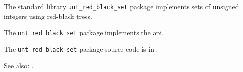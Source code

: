 
The standard library {\tt unt\_red\_black\_set} package implements sets of unsigned integers 
using red-black trees.

The {\tt unt\_red\_black\_set} package implements the  api.

The {\tt unt\_red\_black\_set} package source code is in .

See also:  .



